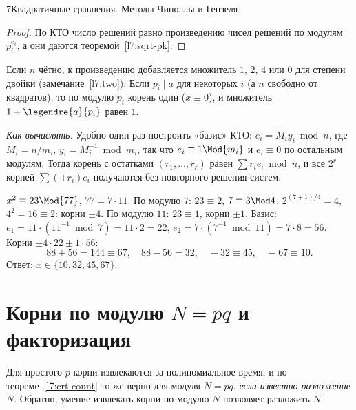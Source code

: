 \begin{lecture}{7}{Квадратичные сравнения. Методы Чиполлы и Гензеля}
\begin{proof}
По КТО число решений равно произведению чисел решений по модулям $p_i^{e_i}$, а они даются
теоремой~\ref{l7:sqrt-pk}.
\end{proof}

Если $n$ чётно, к произведению добавляется множитель $1$, $2$, $4$ или $0$ для степени двойки
(замечание~\ref{l7:two}). Если $p_i \mid a$ для некоторых $i$ (а $n$ свободно от квадратов), то по
модулю $p_i$ корень один ($x \equiv 0$), и множитель $1 + \legendre{a}{p_i}$ равен $1$.

\emph{Как вычислять.} Удобно один раз построить «базис» КТО: $e_i = M_i y_i \bmod n$, где
$M_i = n/m_i$, $y_i = M_i^{-1} \bmod m_i$, так что $e_i \equiv 1 \Mod{m_i}$ и $e_i \equiv 0$ по
остальным модулям. Тогда корень с остатками $(r_1, \dots, r_r)$ равен $\sum r_i e_i \bmod n$, и
все $2^r$ корней $\sum (\pm r_i) e_i$ получаются без повторного решения систем.

\begin{example}\label{l7:ex-77}
$x^2 \equiv 23 \Mod{77}$, $77 = 7 \cdot 11$. По модулю $7$: $23 \equiv 2$, $7 \equiv 3 \Mod 4$,
$2^{(7+1)/4} = 4$, $4^2 = 16 \equiv 2$: корни $\pm 4$. По модулю $11$: $23 \equiv 1$, корни $\pm 1$.
Базис: $e_1 = 11 \cdot (11^{-1} \bmod 7) = 11 \cdot 2 = 22$, $e_2 = 7 \cdot (7^{-1} \bmod 11) =
7 \cdot 8 = 56$. Корни $\pm 4 \cdot 22 \pm 1 \cdot 56$:
\[
  88 + 56 = 144 \equiv 67, \quad 88 - 56 = 32, \quad -32 \equiv 45, \quad -67 \equiv 10.
\]
Ответ: $x \in \{10, 32, 45, 67\}$.
\end{example}



\section{\texorpdfstring{Корни по модулю $N = pq$ и факторизация}{Корни по модулю N = pq и факторизация}}\label{l7:sec-rabin}

Для простого $p$ корни извлекаются за полиномиальное время, и по теореме~\ref{l7:crt-count} то же
верно для модуля $N = pq$, \emph{если известно разложение} $N$. Обратно, умение извлекать корни
по модулю $N$ позволяет разложить $N$.


\end{lecture}
